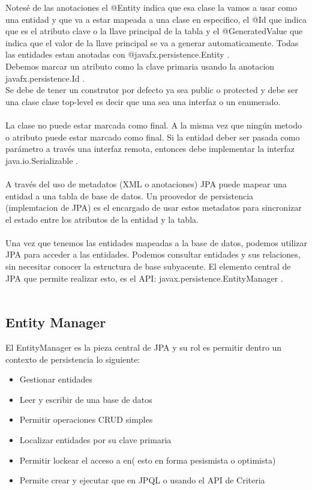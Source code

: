 \documentclass{article}
\begin{document}
Notesé de las anotaciones el @Entity indica que esa clase la vamos a usar como una entidad y que va a estar mapeada a una clase en especifico, el @Id
que indica que es el atributo clave o la llave principal de la tabla y el @GeneratedValue que indica que el valor de la llave principal se va a generar
automaticamente. Todas las entidades estan anotadas con @javafx.persistence.Entity . \\ Debemos marcar un atributo como la clave primaria usando la anotacion
javafx.persistence.Id . \\ Se debe de tener un construtor por defecto ya sea public o protected y debe ser una clase clase top-level es decir que una sea una interfaz
o un enumerado. \\ \\

La clase no puede estar marcada como final. A la misma vez que ningún metodo o atributo puede estar marcado como final. Si la entidad deber ser pasada como parámetro a través
una interfaz remota, entonces debe implementar la interfaz java.io.Serializable .\\ \\

A través del uso de metadatos (XML o anotaciones) JPA puede mapear una entidad a una tabla de base de datos. Un proovedor de persistencia (implemtacion de JPA) es el encargado
de usar estos metadatos para sincronizar el estado entre los atributos de la entidad y la tabla.\\ \\

Una vez que tenemos las entidades mapeadas a la base de datos, podemos utilizar JPA para acceder a las entidades. Podemos consultar entidades y sus relaciones, sin necesitar conocer
la estructura de base subyacente. El elemento central de JPA que permite realizar esto, es el API: javax.persistence.EntityManager .\\ \\

\subsection*{Entity Manager}
El EntityManager es la pieza central de JPA y su rol es permitir dentro un contexto de persistencia lo siguiente:
\begin{itemize}
	\item Gestionar entidades
	\item Leer y escribir de una base de datos
	\item Permitir operaciones CRUD simples
	\item Localizar entidades por su clave primaria
	\item Permitir lockear el acceso a en( esto en forma pesismista o optimista)
	\item Permite crear y ejecutar que en JPQL o usando el API de Criteria
\end{itemize}
\end{document}
